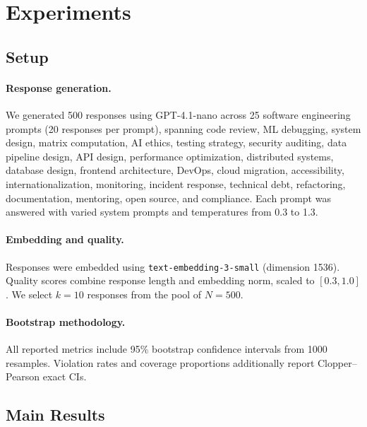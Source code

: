 \documentclass[10pt]{article}
\begin{document}
\section{Experiments}
\label{sec:experiments}

\subsection{Setup}
\label{sec:setup}

\paragraph{Response generation.}
We generated 500 responses using GPT-4.1-nano across 25 software engineering prompts (20 responses per prompt), spanning code review, ML debugging, system design, matrix computation, AI ethics, testing strategy, security auditing, data pipeline design, API design, performance optimization, distributed systems, database design, frontend architecture, DevOps, cloud migration, accessibility, internationalization, monitoring, incident response, technical debt, refactoring, documentation, mentoring, open source, and compliance.
Each prompt was answered with varied system prompts and temperatures from 0.3 to 1.3.

\paragraph{Embedding and quality.}
Responses were embedded using \texttt{text-embedding-3-small} (dimension 1536).
Quality scores combine response length and embedding norm, scaled to $[0.3, 1.0]$.
We select $k=10$ responses from the pool of $N=500$.

\paragraph{Bootstrap methodology.}
All reported metrics include 95\% bootstrap confidence intervals from 1000 resamples.
Violation rates and coverage proportions additionally report Clopper--Pearson exact CIs.

\subsection{Main Results}
\label{sec:main-results}
\end{document}

